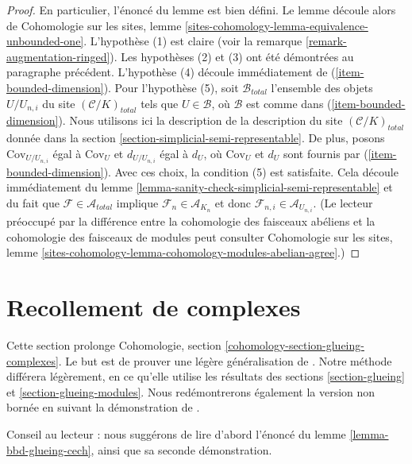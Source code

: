 \begin{proof}
\medskip\noindent
En particulier, l'énoncé du lemme est bien défini.
Le lemme découle alors de Cohomologie sur les sites,
lemme \ref{sites-cohomology-lemma-equivalence-unbounded-one}.
L'hypothèse (1) est claire (voir la remarque \ref{remark-augmentation-ringed}).
Les hypothèses (2) et (3) ont été démontrées au paragraphe précédent.
L'hypothèse (4) découle immédiatement de (\ref{item-bounded-dimension}).
Pour l'hypothèse (5), soit $\mathcal{B}_{total}$ l'ensemble des objets
$U/U_{n, i}$ du site $(\mathcal{C}/K)_{total}$
tels que $U \in \mathcal{B}$, où $\mathcal{B}$ est comme dans
(\ref{item-bounded-dimension}). Nous utilisons ici la description de
la description du site $(\mathcal{C}/K)_{total}$ donnée dans la section
\ref{section-simplicial-semi-representable}.
De plus, posons $\text{Cov}_{U/U_{n, i}}$ égal à $\text{Cov}_U$
et $d_{U/U_{n, i}}$ égal à $d_U$, où $\text{Cov}_U$ et $d_U$
sont fournis par (\ref{item-bounded-dimension}).
Avec ces choix, la condition (5) est satisfaite.
Cela découle immédiatement du lemme
\ref{lemma-sanity-check-simplicial-semi-representable}
et du fait que $\mathcal{F} \in \mathcal{A}_{total}$
implique $\mathcal{F}_n \in \mathcal{A}_{K_n}$ et donc
$\mathcal{F}_{n, i} \in \mathcal{A}_{U_{n, i}}$.
(Le lecteur préoccupé par la différence entre la cohomologie
des faisceaux abéliens et la cohomologie
des faisceaux de modules peut consulter Cohomologie sur les sites, lemme
\ref{sites-cohomology-lemma-cohomology-modules-abelian-agree}.)
\end{proof}










\section{Recollement de complexes}
\label{section-glueing-complexes}

\noindent
Cette section prolonge
Cohomologie, section \ref{cohomology-section-glueing-complexes}.
Le but est de prouver une légère généralisation de \cite[théorème 3.2.4]{BBD}.
Notre méthode différera légèrement, en ce qu'elle utilise
les résultats des sections \ref{section-glueing} et
\ref{section-glueing-modules}. Nous redémontrerons également la
version non bornée en suivant la démonstration de \cite{six-I}.

\medskip\noindent
Conseil au lecteur : nous suggérons de lire d'abord l'énoncé du
lemme \ref{lemma-bbd-glueing-cech}, ainsi que sa seconde démonstration.

